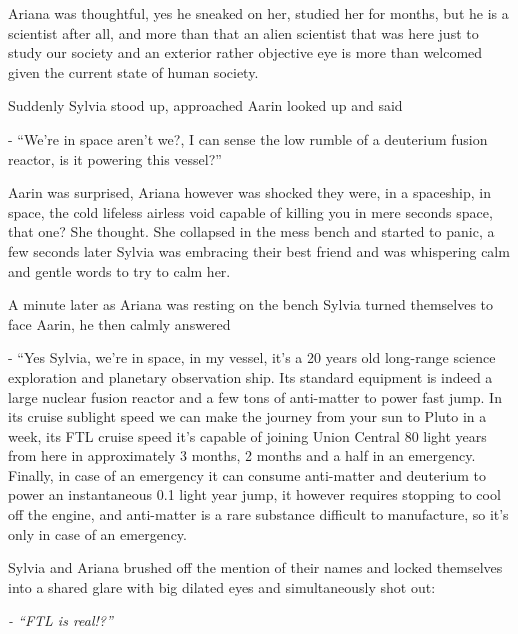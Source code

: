 \documentclass[hidelinks,12pt,a4paper]{book}
\begin{document}
Ariana was thoughtful, yes he sneaked on her, studied her for months, but he is a scientist after all, 
and more than that an alien scientist that was here just to study our society and an exterior rather objective 
eye is more than welcomed given the current state of human society.\par
\bigskip

Suddenly Sylvia stood up, approached Aarin looked up and said \par
\bigskip
- “We're in space aren't we?, I can sense the low rumble of a deuterium fusion reactor, is it powering this vessel?” \par
\bigskip

Aarin was surprised, Ariana however was shocked they were, in a spaceship, in space, the cold lifeless airless void 
capable of killing you in mere seconds space, that one? She thought. She collapsed in the mess bench and started to panic, 
a few seconds later Sylvia was embracing their best friend and was whispering calm and gentle words to try to calm her.\par
\bigskip

A minute later as Ariana was resting on the bench Sylvia turned themselves to face Aarin, he then calmly answered\par
\bigskip

- “Yes Sylvia, we're in space, in my vessel, it's a 20 years old long-range science exploration 
and planetary observation ship. Its standard equipment is indeed a large nuclear fusion reactor and a 
few tons of anti-matter to power fast jump. In its cruise sublight speed we can make the journey from your sun 
to Pluto in a week, its FTL cruise speed it's capable of joining Union Central 80 light years from here 
in approximately 3 months, 2 months and a half in an emergency. Finally, in case of an emergency it can consume 
anti-matter and deuterium to power an instantaneous 0.1 light year jump, it however requires stopping to cool 
off the engine, and anti-matter is a rare substance difficult to manufacture, so it's only in case of an emergency.\par
\bigskip

Sylvia and Ariana brushed off the mention of their names and locked themselves into a shared glare with big 
dilated eyes and simultaneously shot out:\par
\bigskip

\textit{- “FTL is real!?”}\par
\bigskip
\end{document}

